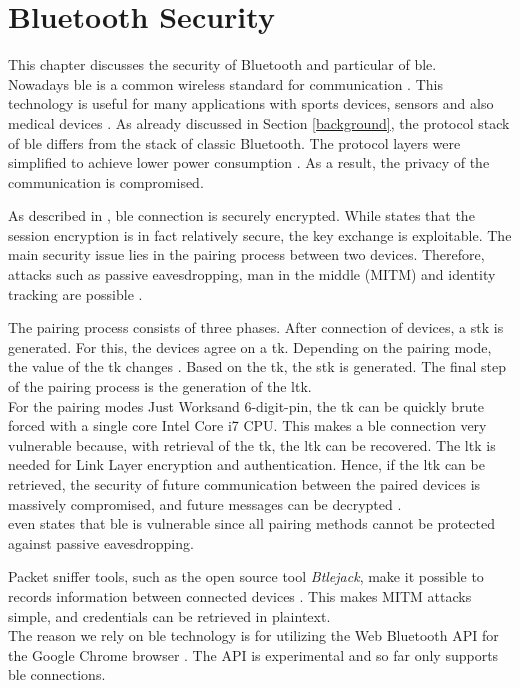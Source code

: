 \section{Bluetooth Security} \label{bluetooth}
This chapter discusses the security of Bluetooth and particular of \gls{ble}. \\
Nowadays \gls{ble} is a common wireless standard for communication \cite{IntroductionBLE}. This technology is useful for many applications with sports devices, sensors and also medical devices \cite{DBLP:conf/woot/Ryan13}.
As already discussed in Section \ref{background}, the protocol stack of \gls{ble} differs from the stack of classic Bluetooth. The protocol layers were simplified to achieve lower power consumption \cite{DBLP:conf/woot/Ryan13}. As a result, the privacy of the communication is compromised.

As described in \cite{DBLP:journals/sensors/GomezOP12}, \gls{ble} connection is securely encrypted. While \cite{DBLP:conf/woot/Ryan13} states that the session encryption is in fact relatively secure, the key exchange is exploitable. The main security issue lies in the pairing process between two devices. Therefore, attacks such as passive eavesdropping, man in the middle (MITM) and identity tracking are possible \cite{IntroductionBLE}.

The pairing process consists of three phases. After connection of devices, a \gls{stk} is generated. For this, the devices agree on a \gls{tk}. Depending on the pairing mode, the value of the \gls{tk} changes \cite{DBLP:conf/woot/Ryan13}. Based on the \gls{tk}, the \gls{stk} is generated. The final step of the pairing process is the generation of the \gls{ltk}. \\
For the pairing modes Just Works\texttrademark and 6-digit-pin, the \gls{tk} can be quickly brute forced with a single core Intel Core i7 CPU. This makes a \gls{ble} connection very vulnerable because, with retrieval of the \gls{tk}, the \gls{ltk} can be recovered. The \gls{ltk} is needed for Link Layer encryption and authentication. Hence, if the \gls{ltk} can be retrieved, the security of future communication between the paired devices is massively compromised, and future messages can be decrypted \cite{DBLP:conf/woot/Ryan13}. \\
\cite{DBLP:journals/sensors/GomezOP12} even states that \gls{ble} is vulnerable since all pairing methods cannot be protected against passive eavesdropping. 

Packet sniffer tools, such as the open source tool \textit{Btlejack}, make it possible to records information between connected devices \cite{BtleJack}. This makes MITM attacks simple, and credentials can be retrieved in plaintext. \\
The reason we rely on \gls{ble} technology is for utilizing the Web Bluetooth API for the Google Chrome browser \cite{WebBTAPI}. The API is experimental and so far only supports \gls{ble} connections. 

